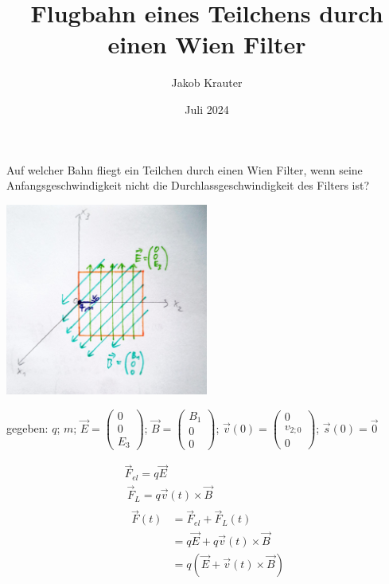 \documentclass[a4paper, 10pt]{article}
\title{Flugbahn eines Teilchens durch einen Wien Filter}
\author{Jakob Krauter}
\date{Juli 2024}
\begin{document}
\maketitle

Auf welcher Bahn fliegt ein Teilchen durch einen Wien Filter, wenn seine Anfangsgeschwindigkeit nicht die Durchlassgeschwindigkeit des Filters ist?

\vspace{2pt}

\centering
\includegraphics[width=0.5\textwidth]{sketch}

\vspace{2pt}

gegeben: $q$; $m$; $\vec{E}=\begin{pmatrix} 0 \\ 0 \\ E_3 \end{pmatrix}$; $\vec{B}=\begin{pmatrix} B_1 \\ 0 \\ 0 \end{pmatrix}$; $\vec{v}(0)=\begin{pmatrix} 0 \\ v_{2;0} \\ 0 \end{pmatrix}$; $\vec{s}(0) = \vec{0}$

\vspace{2pt}

\begin{gather}
\vec{F}_{el} = q \vec{E} \\\
%
\vec{F}_L = q \vec{v}(t) \times \vec{B} \\\
%
\begin{split}
\vec{F}(t) &= \vec{F}_{el} + \vec{F}_L(t)		\\\
           &= q \vec{E} + q \vec{v}(t) \times \vec{B}   \\\
           &= q (\vec{E} + \vec{v}(t) \times \vec{B})
\end{split}
\end{gather}
\end{document}
